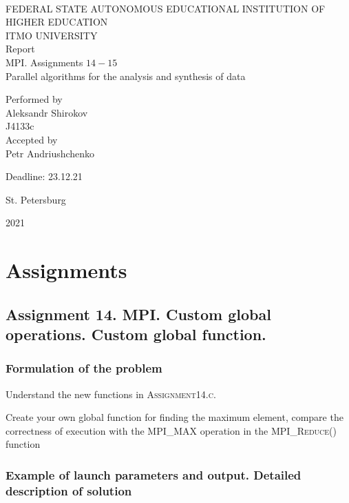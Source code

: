 \documentclass[%
12pt, %
final, %
oneside, %
onecolumn, %
centertags]{article} %
\theoremstyle{plain}
\theoremstyle{definition}
\theoremstyle{remark}
\begin{document}
	\begin{titlepage} 
		\begin{center}
		\textbf{}\\[2.0cm]
		\LARGE FEDERAL STATE AUTONOMOUS EDUCATIONAL INSTITUTION OF HIGHER EDUCATION \\[0.5cm]
		\Large ITMO UNIVERSITY \\[3cm]
		\LARGE Report\\
		\Large MPI. Assignments $14-15$ \\
		\Large Parallel algorithms for the analysis and synthesis of data \\[4cm]


		\begin{flushright}
		Performed by\\
		Aleksandr Shirokov\\
		J4133c\\
		Accepted by\\
		Petr Andriushchenko

		Deadline: 23.12.21
		\end{flushright}

		\vfill 

		{\Large {St. Petersburg}} \par
		{\Large {2021}}
		\end{center} 
	\end{titlepage}

\tableofcontents
\newpage


\section{Assignments}

\subsection{Assignment 14. MPI. Custom global operations. Custom global function.}

\subsubsection{Formulation of the problem}

Understand the new functions in \textsc{Assignment14.c}.

Create your own global function for finding the maximum element, compare the correctness of execution with the \textsc{MPI\_MAX} operation in the \textsc{MPI\_Reduce()} function

\subsubsection{Example of launch parameters and output. Detailed description of solution}
\end{document}
